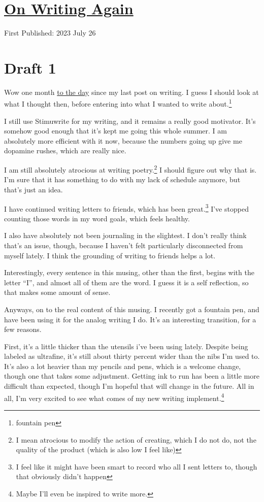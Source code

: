 \documentclass[12pt]{article}[titlepage]
\newcommand{\say}[1]{``#1''}
\newcommand{\1}{\={a}}
\newcommand{\2}{\={e}}
\newcommand{\3}{\={\i}}
\newcommand{\4}{\=o}
\newcommand{\5}{\=u}
\newcommand{\6}{\={A}}
\renewcommand{\,}{\textsuperscript{,}}
\begin{document}
\doublespacing
\section{\href{writing-6.html}{On Writing Again}}
First Published: 2023 July 26

\section{Draft 1}
Wow one month \href{writing-5.html}{to the day} since my last post on writing.
I guess I should look at what I thought then, before entering into what I wanted to write about.\footnote{fountain pen}

I still use Stimuwrite for my writing, and it remains a really good motivator.
It's somehow good enough that it's kept me going this whole summer.
I am absolutely more efficient with it now, because the numbers going up give me dopamine rushes, which are really nice.

I am still absolutely atrocious at writing poetry.\footnote{I mean atrocious to modify the action of creating, which I do not do, not the quality of the product (which is also low I feel like)}
I should figure out why that is.
I'm sure that it has something to do with my lack of schedule anymore, but that's just an idea.

I have continued writing letters to friends, which has been great.\footnote{I feel like it might have been smart to record who all I sent letters to, though that obviously didn't happen}
I've stopped counting those words in my word goals, which feels healthy.

I also have absolutely not been journaling in the slightest.
I don't really think that's an issue, though, because I haven't felt particularly disconnected from myself lately.
I think the grounding of writing to friends helps a lot.

Interestingly, every sentence in this musing, other than the first, begins with the letter \say{I}, and almost all of them are the word.
I guess it is a self reflection, so that makes some amount of sense.

Anyways, on to the real content of this musing.
I recently got a fountain pen, and have been using it for the analog writing I do.
It's an interesting transition, for a few reasons.

First, it's a little thicker than the utensils i've been using lately.
Despite being labeled as ultrafine, it's still about thirty percent wider than the nibs I'm used to.
It's also a lot heavier than my pencils and pens, which is a welcome change, though one that takes some adjustment.
Getting ink to run has been a little more difficult than expected, though I'm hopeful that will change in the future.
All in all, I'm very excited to see what comes of my new writing implement.\footnote{Maybe I'll even be inspired to write more.}
\end{document}
